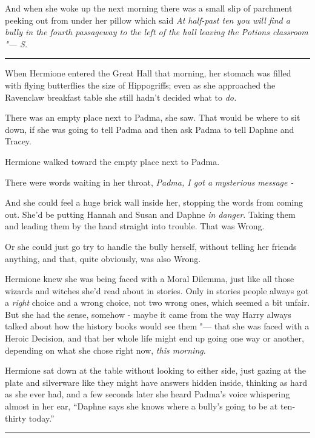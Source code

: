 And when she woke up the next morning there was a small slip of
parchment peeking out from under her pillow which said \emph{At
half-past ten you will find a bully in the fourth passageway to the left
of the hall leaving the Potions classroom "--- S.}

\begin{center}\rule{3in}{0.4pt}\end{center}

When Hermione entered the Great Hall that morning, her stomach was
filled with flying butterflies the size of Hippogriffs; even as she
approached the Ravenclaw breakfast table she still hadn't decided what
to \emph{do.}

There was an empty place next to Padma, she saw. That would be where to
sit down, if she was going to tell Padma and then ask Padma to tell
Daphne and Tracey.

Hermione walked toward the empty place next to Padma.

There were words waiting in her throat, \emph{Padma, I got a}
\emph{mysterious} \emph{message -}

And she could feel a huge brick wall inside her, stopping the words from
coming out. She'd be putting Hannah and Susan and Daphne \emph{in
danger}. Taking them and leading them by the hand straight into trouble.
That was Wrong.

Or she could just go try to handle the bully herself, without telling
her friends anything, and that, quite obviously, was also Wrong.

Hermione knew she was being faced with a Moral Dilemma, just like all
those wizards and witches she'd read about in stories. Only in stories
people always got a \emph{right} choice and a wrong choice, not two
wrong ones, which seemed a bit unfair. But she had the sense, somehow -
maybe it came from the way Harry always talked about how the history
books would see them "--- that she was faced with a Heroic Decision, and
that her whole life might end up going one way or another, depending on
what she chose right now, \emph{this morning}.

Hermione sat down at the table without looking to either side, just
gazing at the plate and silverware like they might have answers hidden
inside, thinking as hard as she ever had, and a few seconds later she
heard Padma's voice whispering almost in her ear, ``Daphne says she
knows where a bully's going to be at ten-thirty today.''

\begin{center}\rule{3in}{0.4pt}\end{center}

